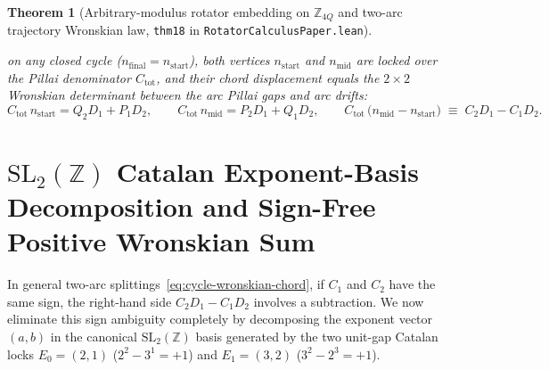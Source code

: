 \documentclass[11pt,a4paper]{article}
\newtheorem{theorem}{Theorem}[section]
\theoremstyle{definition}
\theoremstyle{remark}
\begin{document}
\begin{theorem}[Arbitrary-modulus rotator embedding on $\mathbb{Z}_{4Q}$ and two-arc trajectory Wronskian law, \texttt{thm18} in \texttt{RotatorCalculusPaper.lean}]
\begin{enumerate}[label=\textbf{(\roman*)},leftmargin=*]
  on any closed cycle ($n_{\mathrm{final}} = n_{\mathrm{start}}$), both vertices $n_{\mathrm{start}}$ and $n_{\mathrm{mid}}$ are locked over the Pillai denominator $C_{\mathrm{tot}}$, and their chord displacement equals the $2\times 2$ Wronskian determinant between the arc Pillai gaps and arc drifts:
  \begin{equation}
    \label{eq:cycle-wronskian-chord}
    C_{\mathrm{tot}}\,n_{\mathrm{start}} = Q_2 D_1 + P_1 D_2, \qquad
    C_{\mathrm{tot}}\,n_{\mathrm{mid}} = P_2 D_1 + Q_1 D_2, \qquad
    C_{\mathrm{tot}}\,\bigl(n_{\mathrm{mid}} - n_{\mathrm{start}}\bigr) \;\equiv\; C_2 D_1 - C_1 D_2.
  \end{equation}
\end{enumerate}
\end{theorem}

\section{$\mathrm{SL}_2(\mathbb{Z})$ Catalan Exponent-Basis Decomposition and Sign-Free Positive Wronskian Sum}
\label{sec:catalan-basis}

In general two-arc splittings~\eqref{eq:cycle-wronskian-chord}, if $C_1$ and $C_2$ have the same sign, the right-hand side $C_2 D_1 - C_1 D_2$ involves a subtraction. We now eliminate this sign ambiguity completely by decomposing the exponent vector $(a,b)$ in the canonical $\mathrm{SL}_2(\mathbb{Z})$ basis generated by the two unit-gap Catalan locks $E_0 = (2,1)$ ($2^2 - 3^1 = +1$) and $E_1 = (3,2)$ ($3^2 - 2^3 = +1$).
\end{document}
